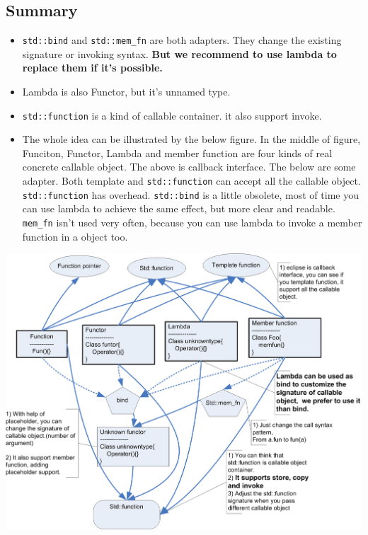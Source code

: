 \documentclass[a4paper,11pt,twoside]{book}
\begin{document}
\subsection{Summary}
\begin{itemize}
	\item \texttt{std::bind} and \texttt{std::mem\_fn} are both adapters. They change the existing signature or invoking syntax. \textbf{But we recommend to use lambda to replace them if it's possible.}
	
	\item Lambda is also Functor, but it's unnamed type.
	
	\item \texttt{std::function} is a kind of callable container. it also support invoke.
	
	\item The whole idea can be illustrated by the below figure. In the middle of figure, Funciton, Functor, Lambda and member function are four kinds of real concrete callable object. The above is callback interface. The below are some adapter. Both template and \texttt{std::function} can accept all the callable object. \texttt{std::function} has overhead. \texttt{std::bind} is a little obsolete, most of time you can use lambda to achieve the same effect, but more clear and readable. \texttt{mem\_fn} isn't used very often, because you can use lambda to invoke a member function in a object too.  
	
\end{itemize}
\begin{center}
	\includegraphics[width=0.95\linewidth]{pics/callable.png}
\end{center}
	
\end{document}
